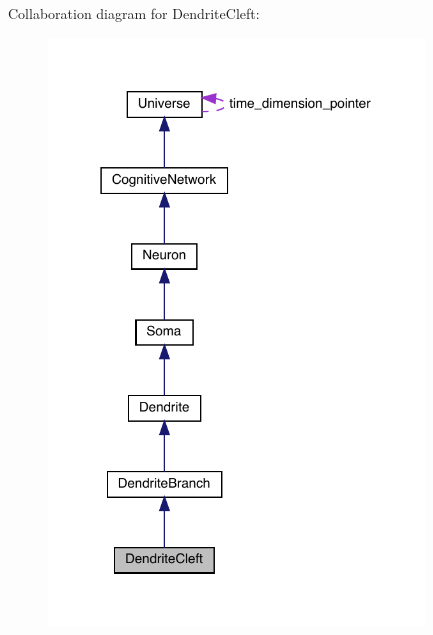 Collaboration diagram for Dendrite\+Cleft\+:\nopagebreak
\begin{figure}[H]
\begin{center}
\leavevmode
\includegraphics[width=283pt]{class_dendrite_cleft__coll__graph}
\end{center}
\end{figure}
